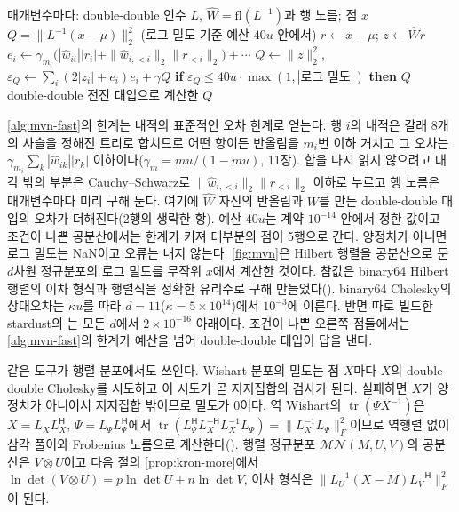 \begin{algorithm}[htbp]
\begin{algorithmic}[1]
\Require 매개변수마다: double-double 인수 $L$, $\widehat W=\mathrm{fl}(L^{-1})$과 행 노름; 점 $x$
\Ensure $Q=\|L^{-1}(x-\mu)\|_2^2$ (로그 밀도 기준 예산 $40u$ 안에서)
\State $r\gets x-\mu$; $z\gets\widehat Wr$ 
\State $e_i\gets\gamma_{m_i}\bigl(|\widehat w_{ii}||r_i|+\|\widehat w_{i,<i}\|_2\|r_{<i}\|_2\bigr)+\cdots$ 
\State $Q\gets\|z\|_2^2$, $\varepsilon_Q\gets\sum_i(2|z_i|+e_i)e_i+\gamma Q$
\State \textbf{if} $\varepsilon_Q\le40u\cdot\max(1,|\text{로그 밀도}|)$ \textbf{then} \Return $Q$
\State \Return double-double 전진 대입으로 계산한 $Q$ 
\end{algorithmic}
\caption{다변량 정규 이차 형식의 빠른 경로 (stardust , )}
\label{alg:mvn-fast}
\end{algorithm}

\cref{alg:mvn-fast}의 한계는 내적의 표준적인 오차 한계로 얻는다. 행 $i$의 내적은 갈래 $8$개의  사슬을 정해진 트리로 합치므로 어떤 항이든 반올림을 $m_i$번 이하 거치고 그 오차는 $\gamma_{m_i}\sum_k|\widehat w_{ik}||r_k|$ 이하이다($\gamma_m=mu/(1-mu)$, 11장). 합을 다시 읽지 않으려고 대각 밖의 부분은 Cauchy--Schwarz로 $\|\widehat w_{i,<i}\|_2\|r_{<i}\|_2$ 이하로 누르고 행 노름은 매개변수마다 미리 구해 둔다. 여기에 $\widehat W$ 자신의 반올림과 $W$를 만든 double-double 대입의 오차가 더해진다(2행의 생략한 항). 예산 $40u$는 계약 $10^{-14}$ 안에서 정한 값이고 조건이 나쁜 공분산에서는 한계가 커져 대부분의 점이 5행으로 간다. 양정치가 아니면 로그 밀도는 NaN이고 오류는 내지 않는다. \cref{fig:mvn}은 Hilbert 행렬을 공분산으로 둔 $d$차원 정규분포의 로그 밀도를 무작위 $x$에서 계산한 것이다. 참값은 binary64 Hilbert 행렬의 이차 형식과 행렬식을 정확한 유리수로 구해 만들었다(). binary64 Cholesky의 상대오차는 $\kappa u$를 따라 $d=11$($\kappa=5\times10^{14}$)에서 $10^{-3}$에 이른다. 반면 따로 빌드한 stardust의 는 모든 $d$에서 $2\times10^{-16}$ 아래이다. 조건이 나쁜 오른쪽 점들에서는 \cref{alg:mvn-fast}의 한계가 예산을 넘어 double-double 대입이 답을 낸다.

같은 도구가 행렬 분포에서도 쓰인다. Wishart 분포의 밀도는 점 $X$마다 $X$의 double-double Cholesky를 시도하고 이 시도가 곧 지지집합의 검사가 된다. 실패하면 $X$가 양정치가 아니어서 지지집합 밖이므로 밀도가 $0$이다. 역 Wishart의 $\operatorname{tr}(\Psi X^{-1})$은 $X=L_XL_X^{\mathsf H}$, $\Psi=L_\Psi L_\Psi^{\mathsf H}$에서 $\operatorname{tr}(L_\Psi^{\mathsf H}L_X^{-\mathsf H}L_X^{-1}L_\Psi)=\|L_X^{-1}L_\Psi\|_F^2$이므로 역행렬 없이 삼각 풀이와 Frobenius 노름으로 계산한다(). 행렬 정규분포 $\mathcal{MN}(M,U,V)$의 공분산은 $V\otimes U$이고 다음 절의 \cref{prop:kron-more}에서 $\ln\det(V\otimes U)=p\ln\det U+n\ln\det V$, 이차 형식은 $\|L_U^{-1}(X-M)L_V^{-\mathsf H}\|_F^2$이 된다.

